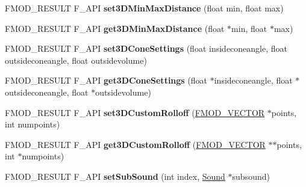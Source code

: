 \begin{DoxyCompactItemize}
\item 
\hypertarget{class_f_m_o_d_1_1_sound_acc2bb0f37e41ccdacfc27ec28cd2cd26}{F\+M\+O\+D\+\_\+\+R\+E\+S\+U\+L\+T F\+\_\+\+A\+P\+I {\bfseries set3\+D\+Min\+Max\+Distance} (float min, float max)}\label{class_f_m_o_d_1_1_sound_acc2bb0f37e41ccdacfc27ec28cd2cd26}

\item 
\hypertarget{class_f_m_o_d_1_1_sound_aca77cc87d0375dcf9d26be19073dcc45}{F\+M\+O\+D\+\_\+\+R\+E\+S\+U\+L\+T F\+\_\+\+A\+P\+I {\bfseries get3\+D\+Min\+Max\+Distance} (float $\ast$min, float $\ast$max)}\label{class_f_m_o_d_1_1_sound_aca77cc87d0375dcf9d26be19073dcc45}

\item 
\hypertarget{class_f_m_o_d_1_1_sound_a9b239365e93cf9ec141b8239b2770e0a}{F\+M\+O\+D\+\_\+\+R\+E\+S\+U\+L\+T F\+\_\+\+A\+P\+I {\bfseries set3\+D\+Cone\+Settings} (float insideconeangle, float outsideconeangle, float outsidevolume)}\label{class_f_m_o_d_1_1_sound_a9b239365e93cf9ec141b8239b2770e0a}

\item 
\hypertarget{class_f_m_o_d_1_1_sound_a9033acfd185c7e24c706e83effbdb516}{F\+M\+O\+D\+\_\+\+R\+E\+S\+U\+L\+T F\+\_\+\+A\+P\+I {\bfseries get3\+D\+Cone\+Settings} (float $\ast$insideconeangle, float $\ast$outsideconeangle, float $\ast$outsidevolume)}\label{class_f_m_o_d_1_1_sound_a9033acfd185c7e24c706e83effbdb516}

\item 
\hypertarget{class_f_m_o_d_1_1_sound_a277c94985b2caf5aed6125604a6d6f74}{F\+M\+O\+D\+\_\+\+R\+E\+S\+U\+L\+T F\+\_\+\+A\+P\+I {\bfseries set3\+D\+Custom\+Rolloff} (\hyperlink{struct_f_m_o_d___v_e_c_t_o_r}{F\+M\+O\+D\+\_\+\+V\+E\+C\+T\+O\+R} $\ast$points, int numpoints)}\label{class_f_m_o_d_1_1_sound_a277c94985b2caf5aed6125604a6d6f74}

\item 
\hypertarget{class_f_m_o_d_1_1_sound_aeff4d197c2a9edc1dd746b519d63f490}{F\+M\+O\+D\+\_\+\+R\+E\+S\+U\+L\+T F\+\_\+\+A\+P\+I {\bfseries get3\+D\+Custom\+Rolloff} (\hyperlink{struct_f_m_o_d___v_e_c_t_o_r}{F\+M\+O\+D\+\_\+\+V\+E\+C\+T\+O\+R} $\ast$$\ast$points, int $\ast$numpoints)}\label{class_f_m_o_d_1_1_sound_aeff4d197c2a9edc1dd746b519d63f490}

\item 
\hypertarget{class_f_m_o_d_1_1_sound_ab326892db719b2e98dc0d14b91b0a17c}{F\+M\+O\+D\+\_\+\+R\+E\+S\+U\+L\+T F\+\_\+\+A\+P\+I {\bfseries set\+Sub\+Sound} (int index, \hyperlink{class_f_m_o_d_1_1_sound}{Sound} $\ast$subsound)}\label{class_f_m_o_d_1_1_sound_ab326892db719b2e98dc0d14b91b0a17c}


\end{DoxyCompactItemize}
